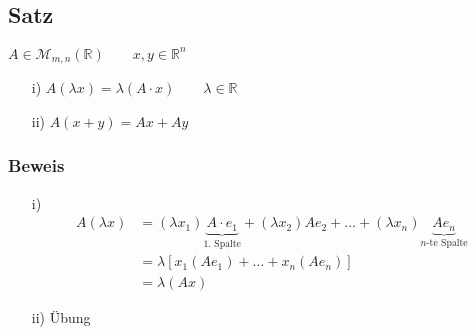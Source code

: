 \documentclass[12pt,titlepage, pdf]{article}
\newcommand{\R}{\mathds{R}}
\renewcommand{\>}{\rightarrow}
\renewcommand{\*}{\cdot}
\begin{document}
\subsection{Satz}
\label{2.6}
$A \in \mathcal{M}_{m,n}(\R)\qquad x,y \in \R^n$\\
\begin{itemize}
	\item[i)] $A(\lambda x) = \lambda (A \cdot x) \qquad \lambda \in \R$
	\item[ii)] $A(x+y) = Ax +  Ay$
\end{itemize}
\subsubsection*{Beweis}
\begin{itemize}
	\item[i)] \begin{align*}
	A(\lambda x) &= (\lambda x_1) \underbrace{A \cdot e_1}_{\textrm{1. Spalte}} + (\lambda x_2)A e_2 +...+ (\lambda x_n)\underbrace{A e_n}_{n\textrm{-te Spalte}}\\
	&= \lambda[x_1 (Ae_1) + ... + x_n (Ae_n)] \\
	&= \lambda (Ax)
	\end{align*}
	\item[ii)] Übung
\end{itemize}
\end{document}
